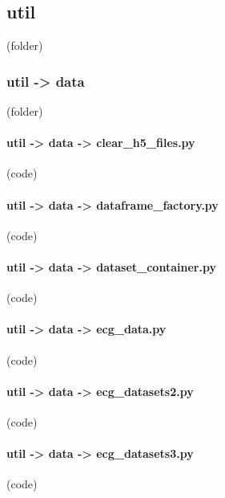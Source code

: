 \begin{myparindent}{0pt}
\noindent\subsection[util]{util} (folder)
\noindent\subsubsection[data]{util -> data} (folder)
\noindent\paragraph[clear\_h5\_files.py]{util -> data -> clear\_h5\_files.py} (code)

\noindent\paragraph[dataframe\_factory.py]{util -> data -> dataframe\_factory.py} (code)

\noindent\paragraph[dataset\_container.py]{util -> data -> dataset\_container.py} (code)

\noindent\paragraph[ecg\_data.py]{util -> data -> ecg\_data.py} (code)

\noindent\paragraph[ecg\_datasets2.py]{util -> data -> ecg\_datasets2.py} (code)

\noindent\paragraph[ecg\_datasets3.py]{util -> data -> ecg\_datasets3.py} (code)


\end{myparindent}
